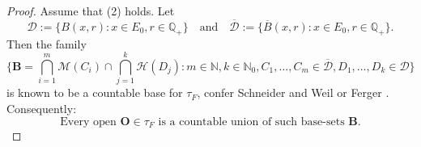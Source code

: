 \documentclass[sn-mathphys,Numbered]{sn-jnl}%
\theoremstyle{thmstyleone}%
\theoremstyle{thmstyletwo}%
\theoremstyle{thmstylethree}%
\begin{document}
\begin{proof} Assume that (2) holds. Let
$$
 \mathcal{D}:=\{B(x,r): x \in E_0, r \in \mathbb{Q}_+\} \quad \text{and} \quad \overline{\mathcal{D}}:=\{\overline{B}(x,r): x \in E_0, r \in \mathbb{Q}_+\}.
$$
Then the family
\begin{equation} \label{cbase}
 \{ \textbf{B}=\bigcap_{i=1}^m \mathcal{M}(C_i) \cap \bigcap_{j=1}^k \mathcal{H}(D_j): m \in \mathbb{N}, k \in \mathbb{N}_0, C_1,\ldots,C_m \in \overline{\mathcal{D}}, D_1, \ldots, D_k \in \mathcal{D}\}
\end{equation}
is known to be a countable base for $\tau_F$, confer Schneider and Weil \cite{Weil} or Ferger \cite{Ferger0}. Consequently:
\begin{equation} \label{countopen}
 \text{Every open } \textbf{O} \in \tau_F \text{ is a countable union of such base-sets } \textbf{B}.
\end{equation}


\end{proof}
\end{document}
